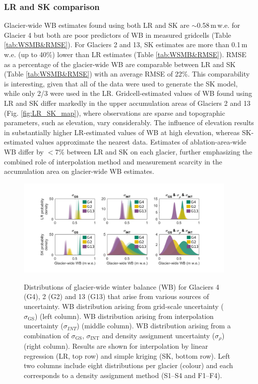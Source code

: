\documentclass[review,oneside, letterpaper]{igs} %
\begin{document}
\subsubsection{LR and SK comparison}

Glacier-wide WB estimates found using both LR and SK are $\sim$0.58\,m\,w.e. for Glacier 4 but both are poor predictors of  WB in measured gridcells (Table \ref{tab:WSMB&RMSE}). For Glaciers 2 and 13, SK estimates are more than 0.1\,m\,w.e. (up to 40\%) lower than LR estimates (Table \ref{tab:WSMB&RMSE}). RMSE as a percentage of the glacier-wide WB are comparable between LR and SK (Table \ref{tab:WSMB&RMSE}) with an average RMSE of 22\%. This comparability is interesting, given that all of the data were used to generate the SK model, while only 2/3 were used in the LR. Gridcell-estimated values of WB found using LR and SK differ markedly in the upper accumulation areas of Glaciers 2 and 13 (Fig. \ref{fig:LR_SK_map}), where observations are sparse and topographic parameters, such as elevation, vary considerably. The influence of elevation results in substantially higher LR-estimated values of WB at high elevation, whereas SK-estimated values approximate the nearest data. Estimates of ablation-area-wide WB differ by $<$7\% between LR and SK on each glacier, further emphasizing the combined role of interpolation method and measurement scarcity in the accumulation area on glacier-wide WB estimates.

\begin{figure}
	\centering
	\includegraphics[width =0.95\textwidth]{WSMBDist.pdf}\\
	\caption{Distributions of glacier-wide winter balance (WB) for Glaciers 4 (G4), 2 (G2) and 13 (G13) that arise from various sources of uncertainty. WB distribution arising from grid-scale uncertainty ($\sigma_{\mathrm{GS}}$) (left column). WB distribution arising from interpolation uncertainty ($\sigma_{INT}$) (middle column). WB distribution arising from a combination of $\sigma_{\mathrm{GS}}$, $\sigma_{\mathrm{INT}}$ and density assignment uncertainty ($\sigma_{\rho}$) (right column). Results are shown for interpolation by linear regression (LR, top row) and simple kriging (SK, bottom row). Left two columns include eight distributions per glacier (colour) and each corresponds to a density assignment method (S1--S4 and F1--F4).}
	\label{fig:WSMBDist_LR}
\end{figure}
\end{document}
